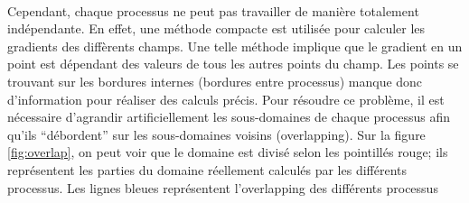 \paragraph{} Cependant, chaque processus ne peut pas travailler de manière totalement indépendante. En effet, une méthode compacte est utilisée pour calculer les gradients des diffèrents champs. Une telle méthode implique que le gradient en un point est dépendant des valeurs de tous les autres points du champ. Les points se trouvant sur les bordures internes (bordures entre processus) manque donc d'information pour réaliser des calculs précis. Pour résoudre ce problème, il est nécessaire d'agrandir artificiellement les sous-domaines de chaque processus afin qu'ils ``débordent'' sur les sous-domaines voisins (overlapping). Sur la figure \ref{fig:overlap}, on peut voir que le domaine est divisé selon les pointillés rouge; ils représentent les parties du domaine réellement calculés par les différents processus. Les lignes bleues représentent l'overlapping des différents processus


